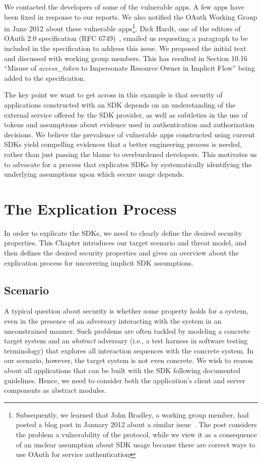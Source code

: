 We contacted the developers of some of the vulnerable apps. A few apps have been fixed in response to our reports.  We also notified the OAuth Working Group in June 2012 about these vulnerable apps\footnote{Subsequently, we learned that John Bradley, a working group member, had posted a blog post in January 2012 about a similar issue~\cite{OAuthVulBlogPost}. The post considers the problem a vulnerability of the protocol, while we view it as a consequence of an unclear assumption about SDK usage because there are correct ways to use OAuth for service authentication}.  Dick Hardt, one of the editors of OAuth 2.0 specification (RFC 6749)~\cite{OAuth2.0}, emailed us requesting a paragraph to be included in the specification to address this issue.  We proposed the initial text and discussed with working group members.  This has resulted in Section 10.16 ``Misuse of \emph{access\_token} to Impersonate Resource Owner in Implicit Flow'' being added to the specification.

The key point we want to get across in this example is that security of applications constructed with an SDK depends on an understanding of the external service offered by the SDK provider, as well as subtleties in the use of tokens and assumptions about evidence used in authentication and authorization decisions.  We believe the prevalence of vulnerable apps constructed using current SDKs yield compelling evidences that a better engineering process is needed, rather than just passing the blame to overburdened developers.  This motivates us to advocate for a process that explicates SDKs by systematically identifying the underlying assumptions upon which secure usage depends.

\section{The Explication Process}
\label{sec:explicating_explication_process}

In order to explicate the SDKs, we need to clearly define the desired security properties. This Chapter introduces our target scenario and threat model, and then defines the desired security properties and gives an overview about the explication process for uncovering implicit SDK assumptions.

\subsection{Scenario}

A typical question about security is whether some property holds for a system, even in the presence of an adversary interacting with the system in an unconstrained manner.  Such problems are often tackled by modeling a concrete target system and an \emph{abstract} adversary (i.e., a test harness in software testing terminology) that explores all interaction sequences with the concrete system.  In our scenario, however, the target system is not even concrete.  We wish to reason about all applications that can be built with the SDK following documented guidelines.  Hence, we need to consider both the application's client and server components as abstract modules.

